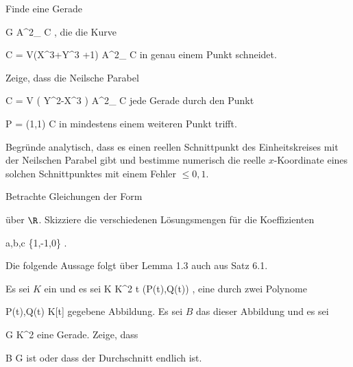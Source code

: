 {}
{
Finde eine Gerade

\mavergleichskette
{\vergleichskette
{G
}
{ \subseteq }{ {\mathbb A}^{2}_{ {\mathbb C} }
}
{  }{
}
{    }{
}
{   }{
}
}
{}{}{,}
die die Kurve

\mavergleichskettedisp
{\vergleichskette
{ C
}
{ =} { V(X^3+Y^3 +1)
}
{ \subseteq} { {\mathbb A}^{2}_{ {\mathbb C} }
}
{ } {
}
{ } {
}
}
{}{}{}
in genau einem Punkt schneidet.

}
{} {}


{}
{
Zeige, dass die Neilsche Parabel

\mavergleichskettedisp
{\vergleichskette
{ C
}
{ =} { V \left(  Y^2-X^3  \right)
}
{ \subseteq} { {\mathbb A}^{2}_{ {\mathbb C} }
}
{ } {
}
{ } {
}
}
{}{}{}
jede Gerade durch den Punkt

\mavergleichskette
{\vergleichskette
{P
}
{ = }{ (1,1)
}
{ \in }{ C
}
{    }{
}
{   }{
}
}
{}{}{}
in mindestens einem weiteren Punkt trifft.

}
{} {}


{}
{
Begründe analytisch, dass es einen reellen Schnittpunkt des Einheitskreises
 mit der Neilschen Parabel
 gibt und bestimme numerisch die reelle $x$-Koordinate eines solchen Schnittpunktes mit einem Fehler $\leq 0,1$.

}
{} {}


{}
{
Betrachte Gleichungen der Form

 {  }

über $\R$. Skizziere die verschiedenen Lösungsmengen für die Koeffizienten

\mavergleichskette
{\vergleichskette
{ a,b,c
}
{ \in }{ \{1,-1,0\}
}
{  }{
}
{    }{
}
{   }{
}
}
{}{}{.}

}
{} {}
Die folgende Aussage folgt über
Lemma 1.3
auch aus
Satz 6.1.


{}
{
Es sei $K$ ein
und es sei
\maabbeledisp {} { K } { K^2
} { t } { (P(t),Q(t))
} {,}
eine durch zwei Polynome

\mavergleichskette
{\vergleichskette
{ P(t),Q(t)
}
{ \in }{ K[t]
}
{  }{
}
{    }{
}
{   }{
}
}
{}{}{}
gegebene Abbildung. Es sei $B$ das
dieser Abbildung und es sei

\mavergleichskette
{\vergleichskette
{ G
}
{ \subseteq }{ K^2
}
{  }{
}
{    }{
}
{   }{
}
}
{}{}{}
eine Gerade. Zeige, dass

\mavergleichskette
{\vergleichskette
{ B
}
{ \subseteq }{ G
}
{  }{
}
{    }{
}
{   }{
}
}
{}{}{}
ist oder dass der Durchschnitt
 endlich ist.

}
{} {}


